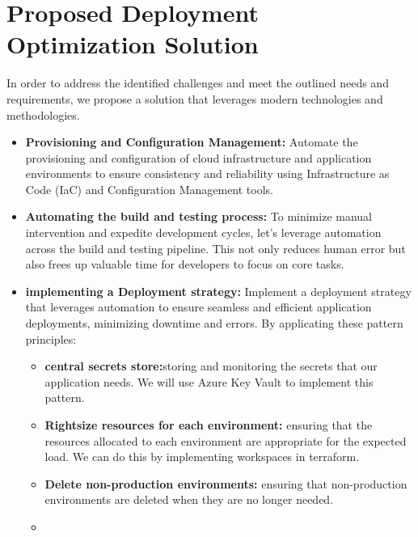 \section{Proposed Deployment Optimization Solution}
In order to address the identified challenges and meet the outlined needs and requirements, we propose a solution that leverages modern technologies and methodologies.
\begin{itemize}

\item \textbf{Provisioning and Configuration Management:}
Automate the provisioning and configuration of cloud infrastructure and application environments to ensure consistency and reliability using Infrastructure as Code (IaC) and Configuration Management tools.

\item \textbf{Automating the build and testing process:}
To minimize manual intervention and expedite development cycles, let's leverage automation across the build and testing pipeline. This not only reduces human error but also frees up valuable time for developers to focus on core tasks.
\item \textbf{implementing a Deployment strategy:}
Implement a deployment strategy that leverages automation to ensure seamless and efficient application deployments, minimizing downtime and errors. By applicating these pattern principles:
\begin{itemize}
    \item \textbf{central secrets store:}storing and monitoring the secrets that our application needs. We will use Azure Key Vault to implement this pattern. 
    \item \textbf{Rightsize resources for each environment:} ensuring that the resources allocated to each environment are appropriate for the expected load. We can do this by implementing workspaces in terraform.   
    \item \textbf{Delete non-production environments:} ensuring that non-production environments are deleted when they are no longer needed.
    \item \end{itemize}
\end{itemize}


